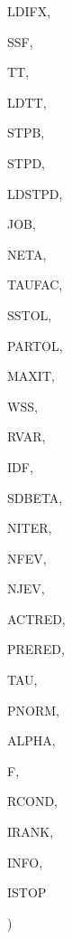 {\begin{DoxyParamCaption}
\item[{integer}]{L\+D\+I\+F\+X, }
\item[{double {\bf precision}, dimension(np)}]{S\+S\+F, }
\item[{double {\bf precision}, dimension(ldtt,{\bf m})}]{T\+T, }
\item[{integer}]{L\+D\+T\+T, }
\item[{double {\bf precision}, dimension(np)}]{S\+T\+P\+B, }
\item[{double {\bf precision}, dimension(ldstpd,{\bf m})}]{S\+T\+P\+D, }
\item[{integer}]{L\+D\+S\+T\+P\+D, }
\item[{integer}]{J\+O\+B, }
\item[{integer}]{N\+E\+T\+A, }
\item[{double {\bf precision}}]{T\+A\+U\+F\+A\+C, }
\item[{double {\bf precision}}]{S\+S\+T\+O\+L, }
\item[{double {\bf precision}}]{P\+A\+R\+T\+O\+L, }
\item[{integer}]{M\+A\+X\+I\+T, }
\item[{double {\bf precision}, dimension(3)}]{W\+S\+S, }
\item[{double {\bf precision}}]{R\+V\+A\+R, }
\item[{integer}]{I\+D\+F, }
\item[{double {\bf precision}, dimension(np)}]{S\+D\+B\+E\+T\+A, }
\item[{integer}]{N\+I\+T\+E\+R, }
\item[{integer}]{N\+F\+E\+V, }
\item[{integer}]{N\+J\+E\+V, }
\item[{double {\bf precision}}]{A\+C\+T\+R\+E\+D, }
\item[{double {\bf precision}}]{P\+R\+E\+R\+E\+D, }
\item[{double {\bf precision}}]{T\+A\+U, }
\item[{double {\bf precision}}]{P\+N\+O\+R\+M, }
\item[{double {\bf precision}}]{A\+L\+P\+H\+A, }
\item[{double {\bf precision}, dimension({\bf n},nq)}]{F, }
\item[{double {\bf precision}}]{R\+C\+O\+N\+D, }
\item[{integer}]{I\+R\+A\+N\+K, }
\item[{integer}]{I\+N\+F\+O, }
\item[{integer}]{I\+S\+T\+O\+P}
\end{DoxyParamCaption}
)}\label{d__odr_8f_a879f14219ac0b106e27f467703a93cc2}
\hypertarget{d__odr_8f_a6e54bf21d9c45ea7421dae931fb2cc64}{}

